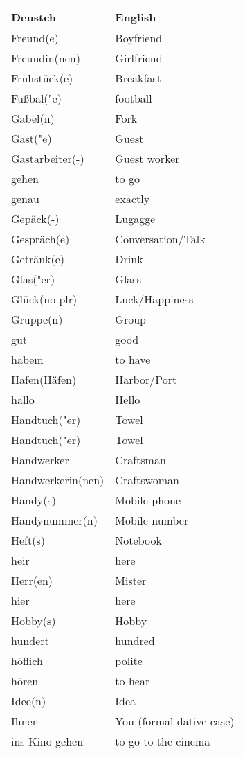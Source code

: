 \documentclass{article}
\renewcommand{\arraystretch}{1}
\begin{document}
\newpage

\begin{minipage}{0.48\textwidth}
    \centering
    \renewcommand{\arraystretch}{1.5}
    \begin{tabular}{|>{\raggedright\arraybackslash}p{3.5cm}|>{\raggedright\arraybackslash}p{3.5cm}|}
        \hline
        \rowcolor{gray!20} \textbf{Deustch} & \textbf{English} \\
        \hline
        Freund(e) & Boyfriend \\\hline
        Freundin(nen) & Girlfriend \\\hline
        Frühstück(e) & Breakfast \\\hline
        Fu\ss{}bal("e) & football \\\hline
        Gabel(n) & Fork \\\hline
        Gast("e) & Guest \\\hline
        Gastarbeiter(-) & Guest worker \\\hline
        gehen & to go \\\hline
        genau & exactly \\\hline
        Gepäck(-) & Lugagge \\\hline
        Gespräch(e) & Conversation/Talk \\\hline
        Getränk(e) & Drink \\\hline
        Glas("er) & Glass \\\hline
        Glück(no plr) & Luck/Happiness \\\hline
        Gruppe(n) & Group \\\hline
        gut & good \\\hline
        habem & to have \\\hline
        Hafen(Häfen) & Harbor/Port \\\hline
        hallo & Hello \\\hline
        Handtuch("er) & Towel \\\hline
        Handtuch("er) & Towel \\\hline
        Handwerker & Craftsman \\\hline
        Handwerkerin(nen) & Craftswoman \\\hline
        Handy(s) & Mobile phone \\\hline
        Handynummer(n) & Mobile number \\\hline
        Heft(s) & Notebook \\\hline
        heir & here \\\hline
        Herr(en) & Mister \\\hline
        hier & here \\\hline
        Hobby(s) & Hobby \\\hline
        hundert &  hundred \\\hline
        höflich & polite \\\hline
        hören & to hear \\\hline
        Idee(n) & Idea \\\hline
        Ihnen & You (formal dative case) \\\hline
        ins Kino gehen & to go to the cinema \\\hline
    \end{tabular}
\end{minipage}%
\end{document}
